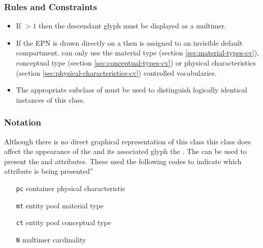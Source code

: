 \begin{logicalkey}
\item {}
\item {}
\item {}
\item {}
\end{logicalkey}

\subsubsection{Rules and Constraints}

\begin{itemize}
\item If  $>1$ then the descendant glyph must be displayed
  as a multimer.
\item If the EPN is drawn directly on a  then
  is assigned to an invisible default
 compartment.
  can only use the material type (section
 \ref{sec:material-types-cv}), conceptual type (section \ref{sec:conceptual-types-cv}) or physical
 characteristics (section \ref{sec:physical-characteristics-cv}) controlled vocabularies.
\item The appropriate subclass of  must be used
  to distinguish logically identical instances of this class.
\end{itemize}

\subsubsection{Notation}

Although there is no direct graphical representation of this class
this class does affect the appearance of the
 and its associated glyph the . The  can be used to present
the  and  attributes. These used
the following codes to indicate which attribute is being presented''

\begin{center}
  \begin{itemize}\setlength{\parskip}{0ex}
  \item[\texttt{pc}] container physical characteristic
  \item[\texttt{mt}] entity pool material type
  \item[\texttt{ct}] entity pool conceptual type
  \item[\texttt{N}]  multimer cardinality
  \end{itemize}
\end{center}


